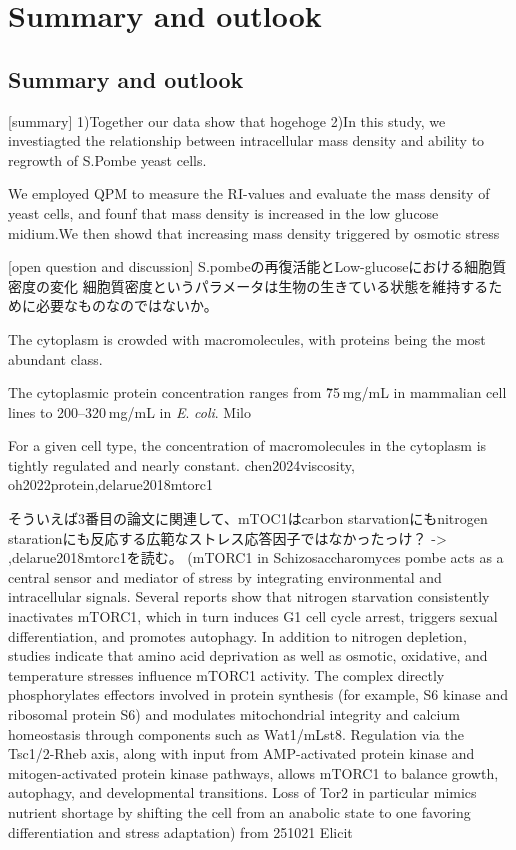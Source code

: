 \chapter{Summary and outlook}
\section{Summary and outlook}
[summary]
1)Together our data show that hogehoge
2)In this study, we investiagted the relationship between intracellular mass density and ability to regrowth of S.Pombe yeast cells.

We employed QPM to measure the RI-values and evaluate the mass density of yeast cells, and founf that mass density is increased in the low glucose midium.We then showd that increasing mass density triggered by osmotic stress 

[open question and discussion]
S.pombeの再復活能とLow-glucoseにおける細胞質密度の変化
細胞質密度というパラメータは生物の生きている状態を維持するために必要なものなのではないか。

The cytoplasm is crowded with macromolecules, with proteins being the most abundant class. 

The cytoplasmic protein concentration ranges from \~75 mg/mL in mammalian cell lines to 200–320 mg/mL in \textit{E}. \textit{coli}. Milo

For a given cell type, the concentration of macromolecules in the cytoplasm is tightly regulated and nearly constant. chen2024viscosity, oh2022protein,delarue2018mtorc1

そういえば3番目の論文に関連して、mTOC1はcarbon starvationにもnitrogen starationにも反応する広範なストレス応答因子ではなかったっけ？ -> ,delarue2018mtorc1を読む。
(mTORC1 in Schizosaccharomyces pombe acts as a central sensor and mediator of stress by integrating environmental and intracellular signals. Several reports show that nitrogen starvation consistently inactivates mTORC1, which in turn induces G1 cell cycle arrest, triggers sexual differentiation, and promotes autophagy. In addition to nitrogen depletion, studies indicate that amino acid deprivation as well as osmotic, oxidative, and temperature stresses influence mTORC1 activity.
The complex directly phosphorylates effectors involved in protein synthesis (for example, S6 kinase and ribosomal protein S6) and modulates mitochondrial integrity and calcium homeostasis through components such as Wat1/mLst8. Regulation via the Tsc1/2-Rheb axis, along with input from AMP-activated protein kinase and mitogen-activated protein kinase pathways, allows mTORC1 to balance growth, autophagy, and developmental transitions. Loss of Tor2 in particular mimics nutrient shortage by shifting the cell from an anabolic state to one favoring differentiation and stress adaptation) from 251021 Elicit

